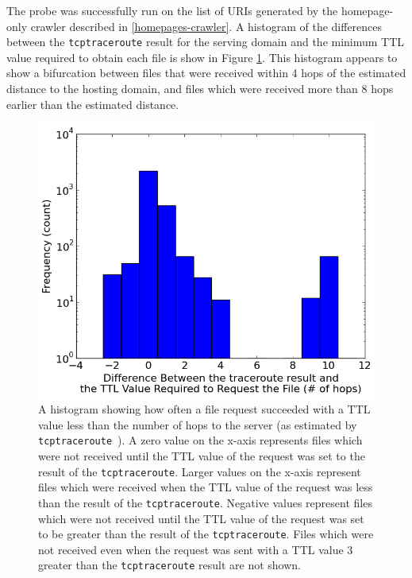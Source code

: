 The probe was successfully run on the list of URIs generated by the homepage-only crawler described in \autoref{homepages-crawler}.
A histogram of the differences between the \texttt{tcptraceroute} result for the serving domain and the minimum TTL value required to obtain each file is show in Figure \ref{fig_gcprobehist}.
This histogram appears to show a bifurcation between files that were received within 4 hops of the estimated distance to the hosting domain, and files which were received more than 8 hops earlier than the estimated distance.
\begin{figure}
	\includegraphics[width=\columnwidth]{figures/gcprobehist}
	\caption{
		A histogram showing how often a file request succeeded with a TTL value less than the number of hops to the server (as estimated by \texttt{tcptraceroute}~\cite{Toren2006}).
		A zero value on the x-axis represents files which were not received until the TTL value of the request was set to the result of the \texttt{tcptraceroute}.
		Larger values on the x-axis represent files which were received when the TTL value of the request was less than the result of the \texttt{tcptraceroute}.
		Negative values represent files which were not received until the TTL value of the request was set to be greater than the result of the \texttt{tcptraceroute}.
		Files which were not received even when the request was sent with a TTL value 3 greater than the \texttt{tcptraceroute} result are not shown.
	}
	\label{fig_gcprobehist}
\end{figure}

